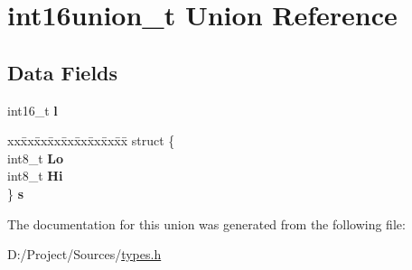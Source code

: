 \hypertarget{unionint16union__t}{}\section{int16union\+\_\+t Union Reference}
\label{unionint16union__t}
\subsection*{Data Fields}
\begin{DoxyCompactItemize}
\item 
\hypertarget{unionint16union__t_ad8a9524a204892ae3d42a2d251ea0643}{}int16\+\_\+t {\bfseries l}\label{unionint16union__t_ad8a9524a204892ae3d42a2d251ea0643}

\item 
\hypertarget{unionint16union__t_a173c74e7b1c0895ad2915e4d76d34b5b}{}\begin{tabbing}
xx\=xx\=xx\=xx\=xx\=xx\=xx\=xx\=xx\=\kill
struct \{\\
\>int8\_t {\bfseries Lo}\\
\>int8\_t {\bfseries Hi}\\
\} {\bfseries s}\label{unionint16union__t_a173c74e7b1c0895ad2915e4d76d34b5b}
\\

\end{tabbing}\end{DoxyCompactItemize}


The documentation for this union was generated from the following file\+:\begin{DoxyCompactItemize}
\item 
D\+:/\+Project/\+Sources/\hyperlink{types_8h}{types.\+h}\end{DoxyCompactItemize}
